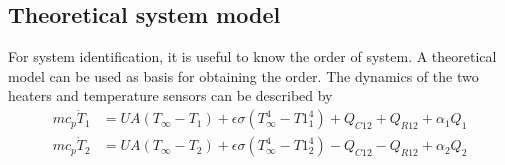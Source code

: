 \subsection{Theoretical system model}\label{TSM}
For system identification, it is useful to know the order of system. A theoretical model can be used as basis for obtaining the order. The dynamics of the two heaters and temperature sensors can be described by \cite{APMonitor}
\begin{align}
    mc_p\dot{T}_1 &= U A (T_{\infty} - T_1) + \epsilon\sigma(T^4_{\infty} - T1^4_1) + Q_{C12} + Q_{R12} +\alpha_1 Q_1 \nonumber \\
    mc_p\dot{T}_2 &= U A (T_{\infty} - T_2) + \epsilon\sigma(T^4_{\infty} - T1^4_2) - Q_{C12} - Q_{R12} +\alpha_2 Q_2 \nonumber
\end{align}

